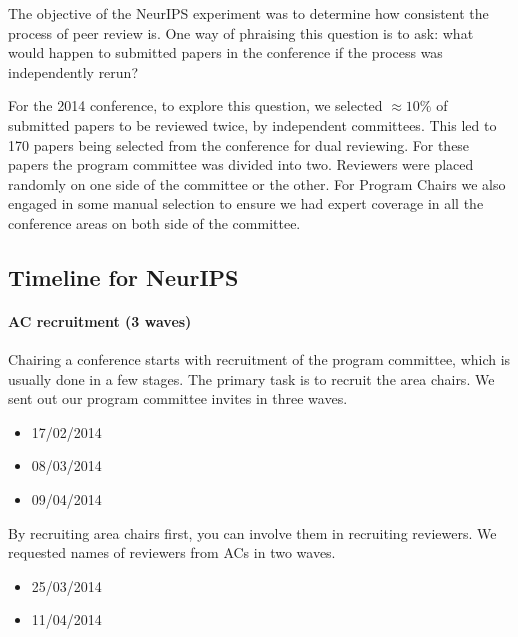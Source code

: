 The objective of the NeurIPS experiment was to determine how consistent
the process of peer review is. One way of phraising this question is to
ask: what would happen to submitted papers in the conference if the
process was independently rerun?

For the 2014 conference, to explore this question, we selected
\(\approx 10\%\) of submitted papers to be reviewed twice, by
independent committees. This led to 170 papers being selected from the
conference for dual reviewing. For these papers the program committee
was divided into two. Reviewers were placed randomly on one side of the
committee or the other. For Program Chairs we also engaged in some
manual selection to ensure we had expert coverage in all the conference
areas on both side of the committee.

\hypertarget{timeline-for-neurips}{%
\subsection{Timeline for NeurIPS}\label{timeline-for-neurips}}

\begin{flushright}
\end{flushright}

\paragraph{AC recruitment (3 waves)}

Chairing a conference starts with recruitment of the program committee,
which is usually done in a few stages. The primary task is to recruit
the area chairs. We sent out our program committee invites in three
waves.

\begin{itemize}
\tightlist
\item
  17/02/2014
\item
  08/03/2014
\item
  09/04/2014
\end{itemize}

By recruiting area chairs first, you can involve them in recruiting
reviewers. We requested names of reviewers from ACs in two waves.

\begin{itemize}
\tightlist
\item
  25/03/2014
\item
  11/04/2014
\end{itemize}

